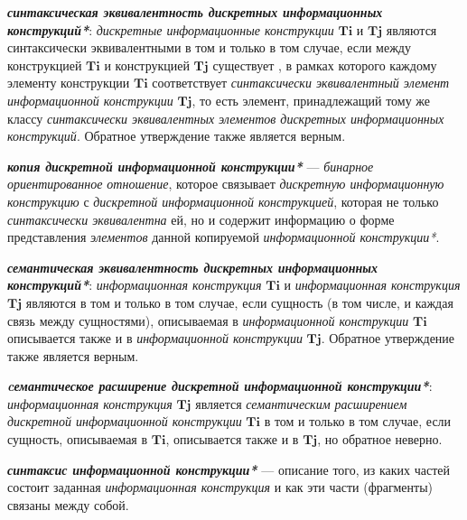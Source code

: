\textbf{\textit{синтаксическая эквивалентность дискретных информационных конструкций*}}: \textit{дискретные информационные конструкции} $\bm{Ti}$ и $\bm{Tj}$ являются синтаксически эквивалентными в том и только в том случае, если между конструкцией \textit{$\bm{Ti}$} и конструкцией \textit{$\bm{Tj}$} существует , в рамках которого каждому элементу конструкции \textit{$\bm{Ti}$} соответствует \textit{синтаксически эквивалентный элемент информационной конструкции} \textit{$\bm{Tj}$}, то есть элемент, принадлежащий тому же классу \textit{синтаксически эквивалентных} \textit{элементов дискретных информационных конструкций}.
Обратное утверждение также является верным.

\textbf{\textit{копия дискретной информационной конструкции*}} --- \textit{бинарное ориентированное отношение}, которое связывает \textit{дискретную информационную конструкцию} с \textit{дискретной информационной конструкцией}, которая не только \textit{синтаксически эквивалентна} ей, но и содержит информацию о форме представления \textit{элементов} данной копируемой \textit{информационной конструкции*}.

\begin{SCn}
\end{SCn}

\textbf{\textit{семантическая эквивалентность дискретных информационных конструкций*}}: \textit{информационная конструкция} \textit{$\bm{Ti}$} и \textit{информационная конструкция} \textit{$\bm{Tj}$} являются  в том и только в том случае, если  сущность (в том числе, и каждая связь между сущностями), описываемая в \textit{информационной конструкции} \textit{$\bm{Ti}$} описывается также и в \textit{информационной конструкции} \textit{$\bm{Tj}$}.
Обратное утверждение также является верным.

\textbf{\textit{cемантическое расширение дискретной информационной конструкции*}}: \textit{информационная конструкция} \textit{$\bm{Tj}$} является \textit{семантическим расширением дискретной информационной конструкции} \textit{$\bm{Ti}$} в том и только в том случае, если  сущность, описываемая в \textit{$\bm{Ti}$}, описывается также и в \textit{$\bm{Tj}$}, но обратное неверно.

\textbf{\textit{синтаксис информационной конструкции*}} --- описание того, из каких частей состоит заданная \textit{информационная конструкция} и как эти части (фрагменты) связаны между собой.

